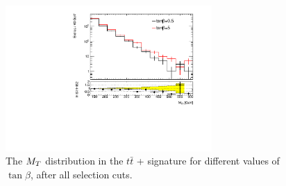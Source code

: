 \begin{figure}[tbp]
\centering
\includegraphics[width = 0.7\textwidth]{texinputs/04_grid/figures/DMHF/mt2plot_comparisonTanBeta.pdf}
  \caption{The $M_{T}$ distribution in the $t\bar{t}$ + \MET signature for different values of $\tan\beta$, after all selection cuts.\label{fig:kin_tanB_afterCuts}}
\end{figure}

